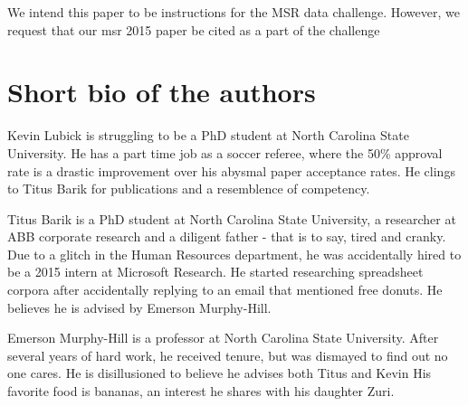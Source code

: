 \documentclass[conference]{IEEEtran}
\begin{document}
We intend this paper to be instructions for the MSR data challenge.  
However, we request that our msr 2015 paper be cited as a part of the challenge
\section{Short bio of the authors}

Kevin Lubick is struggling to be a PhD student at North Carolina State University.  He has a part time job as a soccer referee, where the 50\% approval rate is a drastic improvement over his abysmal paper acceptance rates.  He clings to Titus Barik for publications and a resemblence of competency.

Titus Barik is a PhD student at North Carolina State University, a researcher at ABB corporate research and a diligent father - that is to say, tired and cranky.  Due to a glitch in the Human Resources department, he was accidentally hired to be a 2015 intern at Microsoft Research.  He started researching spreadsheet corpora after accidentally replying to an email that mentioned free donuts.  He believes he is advised by Emerson Murphy-Hill.

Emerson Murphy-Hill is a professor at North Carolina State University.  After several years of hard work, he received tenure, but was dismayed to find out no one cares.  He is disillusioned to believe he advises both Titus and Kevin His favorite food is bananas, an interest he shares with his daughter Zuri.



\end{document}
